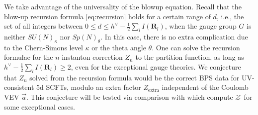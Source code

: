 \documentclass[letterpaper, 11pt]{article}
\def\CZ{{\cal Z}}
\def\k{\kappa}
\begin{document}
{We take advantage of the universality of the blowup equation. Recall that the blow-up recursion formula \eqref{eq:recursion} holds for a certain range of $d$, i.e., the set of all integers between $0 \leq d \leq h^\vee - \frac{1}{2}\sum_l I(\mathbf{R}_l)$, when the gauge group $G$ is neither $ SU(N)_\k$ nor $Sp(N)_\theta$. In this case, there is no extra complication due to the Chern-Simons level $\kappa$ or the theta angle $\theta$.
One can solve the recursion formulae for the $n$-instanton correction $Z_n$ to the partition function, as long as $h^\vee - \frac{1}{2}\sum_l I(\mathbf{R}_l) \geq 2$, even for the exceptional gauge theories. We conjecture that $Z_n$ solved from the recursion formula would be the correct BPS data for UV-consistent 5d SCFTs, modulo an extra factor $Z_\text{extra}$ independent of the Coulomb VEV $\vec{a}$. This conjecture will be tested via comparison with \cite{Kim:2018gjo, DelZotto:2018tcj,Hayashi:2019yxj} which compute $\CZ$ for some exceptional cases. 



}
\end{document}
